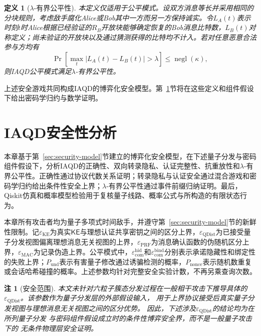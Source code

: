 \documentclass[UTF8,10pt,a4paper]{ctexart}
\theoremstyle{aqdplain}
\newtheorem{definition}{定义}
\newtheorem{remark}{注}
\newcommand{\negl}{\operatorname{negl}}
\newcommand{\Prb}{\Pr}
\begin{document}
\begin{definition}[$\lambda$-有界公平性]
本定义仅适用于公平模式。设双方消息等长并采用相同的分块规则，考虑敌手腐化Alice或Bob其中一方而另一方保持诚实。令$L_A(t)$表示时刻$t$时Alice根据已经验证的$R_B$开放块能够确定恢复的Bob消息比特数，$L_B(t)$对称定义；尚未验证的开放块以及通过猜测获得的比特均不计入。若对任意恶意合法参与方均有
\begin{equation}
\Prb\!\left[\max_t|L_A(t)-L_B(t)|>\lambda\right]
\leq\negl(\kappa),
\label{eq:fairdef}
\end{equation}
则IAQD公平模式满足$\lambda$-有界公平性。
\end{definition}

上述安全游戏共同构成IAQD的博弈化安全模型。第~\ref{sec:security}节将在这些定义和组件假设下给出密码学归约与数学证明。





\section{IAQD安全性分析}
\label{sec:security}

本章基于第~\ref{sec:security-model}节建立的博弈化安全模型，在下述量子分发与密码组件假设下，分析IAQD的正确性、双向转录隐私、认证完整性、抗重放性和$\lambda$-有界公平性。正确性通过协议代数关系证明；转录隐私与认证安全通过混合游戏和密码学归约给出条件性安全上界；$\lambda$-有界公平性通过事件前缀归纳证明。最后，Qiskit仿真和概率模型检验用于复核量子线路、概率公式与所构造的有限状态行为。

本章所有攻击者均为量子多项式时间敌手，并遵守第~\ref{sec:security-model}节的新鲜性限制。记$\varepsilon_{\mathrm{KE}}$为真实$\mathsf{KE}$与理想认证共享密钥之间的区分上界，$\varepsilon_{\mathrm{QDist}}$为已接受量子分发视图偏离理想消息无关视图的上界，$\varepsilon_{\mathrm{PRF}}$为消息确认函数的伪随机区分上界，$\varepsilon_{\mathrm{MAC}}$为记录伪造上界。公平模式中，$\varepsilon_{\mathrm{com}}^{\mathrm{hid}}$和$\varepsilon_{\mathrm{com}}^{\mathrm{bind}}$分别表示承诺隐藏性和绑定性的失败上界；$P_{\mathrm{und}}$表示有害量子修改通过诱骗检测的概率，$P_{\mathrm{nonce}}$表示随机数重复或会话哈希碰撞的概率。上述参数均针对完整安全实验计数，不再另乘查询次数。

\begin{remark}[安全范围]
本文未针对六粒子簇态分发过程在一般相干攻击下推导具体的
$\varepsilon_{\mathrm{QDist}}$。该参数作为量子分发层的外部假设输入，
用于上界协议接受后真实量子分发视图与理想消息无关视图之间的区分优势。
因此，下述涉及$\varepsilon_{\mathrm{QDist}}$的结论均为在所列量子分发
与密码组件假设成立时的条件性博弈安全界，而不是一般量子攻击下的
无条件物理层安全证明。
\end{remark}
\end{document}
